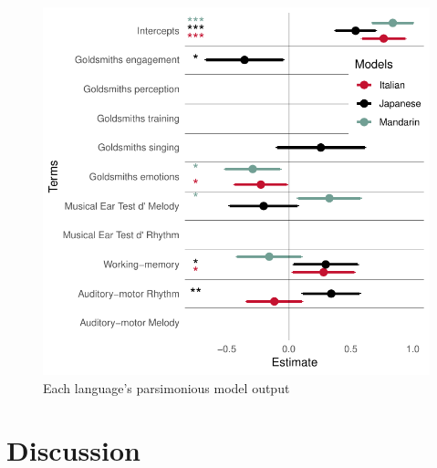 \documentclass[a4paper]{article}
\begin{document}
\begin{figure}[t]
  \centering
  \includegraphics[width=\linewidth]{SP_24_visuals/Japanese,Italian,_Mandarin_max_models_structure:_parsimonious_effects.pdf}
  \caption{Each language's parsimonious model output}
  \label{fig:model}
\end{figure}

\section{Discussion}
\end{document}
